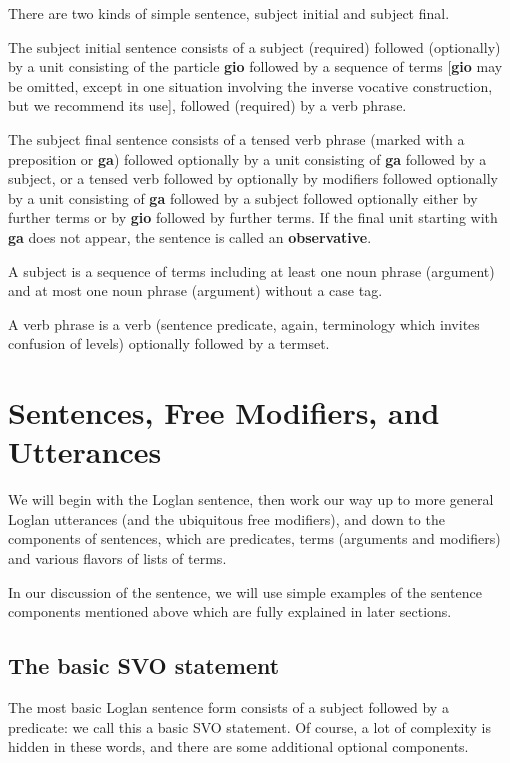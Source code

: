 \documentclass[12pt]{book}
\begin{document}
{There are two kinds of simple sentence, subject initial and subject final.  

The subject initial sentence consists of a subject (required) followed (optionally) by a unit consisting of the particle {\bf gio} followed by a sequence of terms [{\bf gio} may be omitted, except in one situation involving the inverse vocative construction, but we recommend its use], followed (required) by a verb phrase.

The subject final sentence consists of a tensed verb phrase (marked with a preposition or {\bf ga}) followed optionally by a unit consisting of {\bf ga} followed by a subject, or a tensed verb followed by optionally by modifiers followed optionally by a unit consisting of {\bf ga} followed by a subject followed optionally either by further terms or by {\bf gio} followed by further terms.
If the final unit starting with {\bf ga} does not appear, the sentence is called an {\bf observative\/}.

A subject is a sequence of terms including at least one noun phrase (argument) and at most one noun phrase (argument) without a case tag.

A verb phrase is a verb (sentence predicate, again, terminology which invites confusion of levels) optionally followed by a termset.



\section{Sentences, Free Modifiers, and Utterances}

We will begin with the Loglan sentence, then work our way up to more general Loglan utterances (and the ubiquitous free modifiers), and down to the components of sentences, which are predicates, terms (arguments and modifiers) and various flavors of lists of terms.

In our discussion of the sentence, we will use simple examples of the sentence components mentioned above which are fully explained in later sections.

\subsection{The basic SVO statement}

The most basic Loglan sentence form consists of a subject followed by a predicate:  we call this a basic SVO statement.  Of course, a lot of complexity is hidden in these words,
and there are some additional optional components.

}
\end{document}
